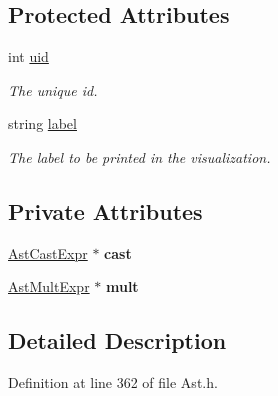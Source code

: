 \subsection*{Protected Attributes}
\begin{DoxyCompactItemize}
\item 
\hypertarget{classAST_a847b778f1c3dd5a19de32de432ee6e15}{int \hyperlink{classAST_a847b778f1c3dd5a19de32de432ee6e15}{uid}}\label{classAST_a847b778f1c3dd5a19de32de432ee6e15}

\begin{DoxyCompactList}\small\item\em The unique id. \end{DoxyCompactList}\item 
\hypertarget{classAST_ab2e239ccc0688d2341724432ff5a1a31}{string \hyperlink{classAST_ab2e239ccc0688d2341724432ff5a1a31}{label}}\label{classAST_ab2e239ccc0688d2341724432ff5a1a31}

\begin{DoxyCompactList}\small\item\em The label to be printed in the visualization. \end{DoxyCompactList}\end{DoxyCompactItemize}
\subsection*{Private Attributes}
\begin{DoxyCompactItemize}
\item 
\hypertarget{classAstMultExpr_a2ce38912b32d3221f8fc66966c9afd48}{\hyperlink{classAstCastExpr}{Ast\-Cast\-Expr} $\ast$ {\bfseries cast}}\label{classAstMultExpr_a2ce38912b32d3221f8fc66966c9afd48}

\item 
\hypertarget{classAstMultExpr_a56e3c113bdb632c76c95a4e220bbe9ab}{\hyperlink{classAstMultExpr}{Ast\-Mult\-Expr} $\ast$ {\bfseries mult}}\label{classAstMultExpr_a56e3c113bdb632c76c95a4e220bbe9ab}

\end{DoxyCompactItemize}


\subsection{Detailed Description}


Definition at line 362 of file Ast.\-h.



